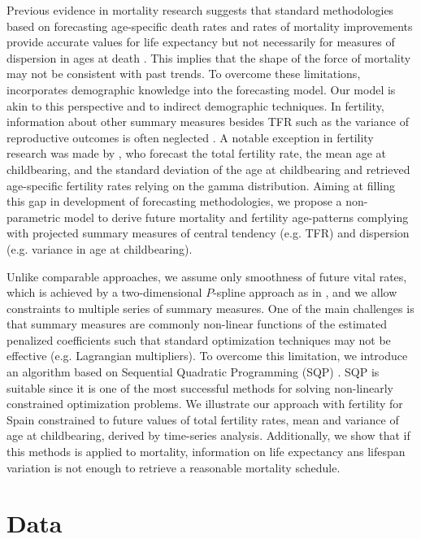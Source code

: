 \documentclass[12pt,a4paper,twoside]{article}
\begin{document}
Previous evidence in mortality research suggests that standard methodologies based on forecasting age-specific death rates and rates of mortality improvements provide accurate values for life expectancy but not necessarily for measures of dispersion in ages at death \citep{bohk2017lifespan}. This implies that the shape of the force of mortality may not be consistent with past trends. To overcome these limitations, \citet{camarda2019smooth} incorporates demographic knowledge into the forecasting model. Our model is akin to this perspective and to indirect demographic techniques. In fertility, information about other summary measures besides TFR such as the variance of reproductive outcomes is often neglected \citep{hruschka2016does}. A notable exception in fertility research was made by \citet{thompson1989multivariate}, who forecast the total fertility rate, the mean age at childbearing, and the standard deviation of the age at childbearing and retrieved age-specific fertility rates relying on the gamma distribution. Aiming at filling this gap in development of forecasting methodologies, we propose a non-parametric model to derive future mortality and fertility age-patterns complying with projected summary measures of central tendency (e.g. TFR) and dispersion (e.g. variance in age at childbearing). 

Unlike comparable approaches, we assume only smoothness of future vital rates, which is achieved by a two-dimensional $P$-spline approach as in \citet{currie2004smoothing}, and we allow constraints to multiple series of summary measures. One of the main challenges is that summary measures are commonly non-linear functions of the estimated penalized coefficients such that standard optimization techniques may not be effective (e.g. Lagrangian multipliers). To overcome this limitation, we introduce an algorithm based on Sequential Quadratic Programming (SQP) \citep{nocedal2006sequential}. SQP is suitable since it is one of the most successful methods for solving non-linearly constrained optimization problems. We illustrate our approach with fertility for Spain constrained to future values of total fertility rates, mean and variance of age at childbearing, derived by time-series analysis. Additionally, we show that if this methods is applied to mortality, information on life expectancy ans lifespan variation is not enough to retrieve a reasonable mortality schedule.

\section{Data}
\end{document}

